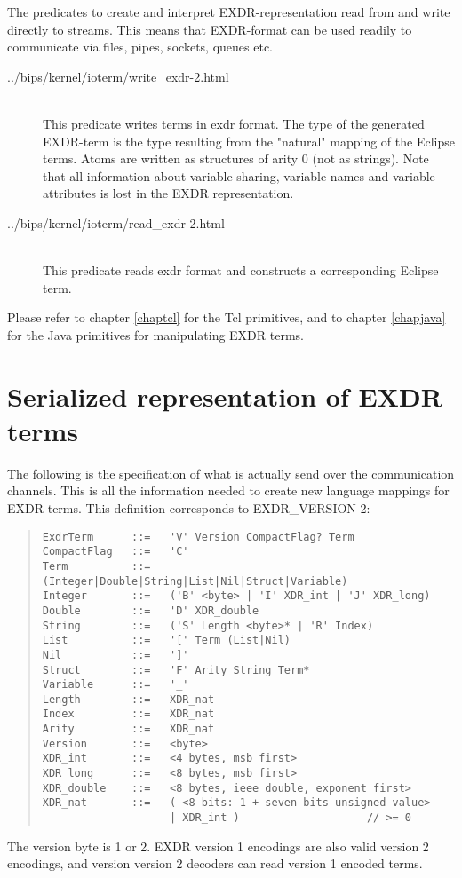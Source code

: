 The {\eclipse} predicates to create and interpret EXDR-representation
read from and write directly to {\eclipse} streams. This means that
EXDR-format can be used readily to communicate via files, pipes,
sockets, queues etc.
\begin{description}
\item[
	{../bips/kernel/ioterm/write_exdr-2.html}]\ \\
    	This predicate writes terms in exdr format.
	The type of the generated EXDR-term is the type resulting
	from the "natural" mapping of the Eclipse terms.
	Atoms are written as structures of arity 0 (not as strings).
	Note that all information about variable sharing, variable
	names and variable attributes is lost in the EXDR representation.

\item[
	{../bips/kernel/ioterm/read_exdr-2.html}]\ \\
    	This predicate reads exdr format and constructs a
	corresponding Eclipse term.
\end{description}

Please refer to chapter \ref{chaptcl} for the Tcl primitives,
and to chapter \ref{chapjava} for the Java primitives for manipulating
EXDR terms. 


\section{Serialized representation of EXDR terms}

The following is the specification of what is actually send over the
communication channels.
This is all the information needed to create new language mappings
for EXDR terms. This definition corresponds to EXDR_VERSION 2:
\begin{quote}\begin{verbatim}
ExdrTerm      ::=   'V' Version CompactFlag? Term
CompactFlag   ::=   'C'
Term          ::=   (Integer|Double|String|List|Nil|Struct|Variable)
Integer       ::=   ('B' <byte> | 'I' XDR_int | 'J' XDR_long)
Double        ::=   'D' XDR_double
String        ::=   ('S' Length <byte>* | 'R' Index)
List          ::=   '[' Term (List|Nil)
Nil           ::=   ']'
Struct        ::=   'F' Arity String Term*
Variable      ::=   '_'
Length        ::=   XDR_nat
Index         ::=   XDR_nat
Arity         ::=   XDR_nat
Version       ::=   <byte>
XDR_int       ::=   <4 bytes, msb first>
XDR_long      ::=   <8 bytes, msb first>
XDR_double    ::=   <8 bytes, ieee double, exponent first>
XDR_nat       ::=   ( <8 bits: 1 + seven bits unsigned value>
                    | XDR_int )                    // >= 0
\end{verbatim}\end{quote}
The version byte is 1 or 2.  EXDR version 1 encodings are also valid
version 2 encodings, and version version 2 decoders can read
version 1 encoded terms.

